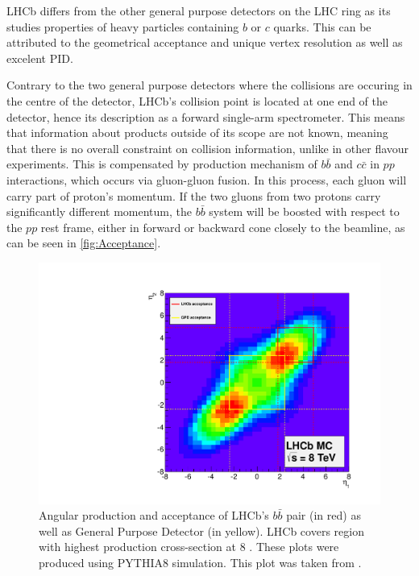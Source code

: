 \Gls{LHCb} differs from the other general purpose detectors on the LHC ring as its studies properties of heavy particles containing $b$ or $c$ quarks. This can be attributed to the geometrical acceptance and unique vertex resolution as well as excelent \Gls{PID}.

Contrary to the two general purpose detectors where the collisions are occuring in the centre of the detector, \Gls{LHCb}'s collision point is located at one end of the detector, hence its description as a forward single-arm spectrometer. This means that information about products outside of its scope are not known, meaning that there is no overall constraint on collision information, unlike in other flavour experiments. This is compensated by production mechanism of $b\bar{b}$ and $c\bar{c}$ in $pp$ interactions, which occurs via gluon-gluon fusion. In this process, each gluon will carry part of proton's momentum. If the two gluons from two protons carry significantly different momentum, the $b\bar{b}$ system will be boosted with respect to the $pp$ rest frame, either in forward or backward cone closely to the beamline, as can be seen in \autoref{fig:Acceptance}.

\begin{figure}
	\centering
	\includegraphics[scale = 0.3]{figs/detector/Acceptance.pdf}
	\caption{Angular production and acceptance of LHCb's $b\bar{b}$ pair (in red) as well as General Purpose Detector (in yellow). LHCb covers region with highest production cross-section at 8 \tev. These plots were produced using PYTHIA8 \cite{pythia8} simulation. This plot was taken from \cite{acceptance}.}
	\label{fig:Acceptance}
\end{figure}

